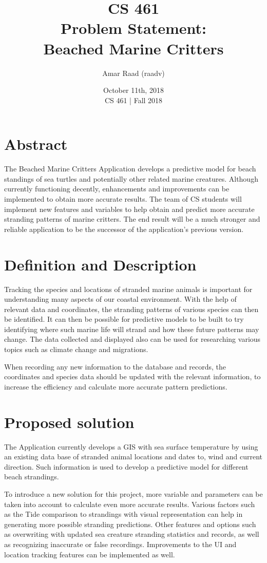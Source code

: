 \documentclass[12pt]{article}
\title{CS 461 \\ Problem Statement: \\ Beached Marine Critters \\}
\author{Amar Raad (raadv)}
\date{October 11th, 2018 \\ CS 461 | Fall 2018}
\begin{document}
\maketitle
\section{Abstract}
The Beached Marine Critters Application develops a predictive model for beach standings of sea turtles 
and potentially other related marine creatures. 
Although currently functioning decently, enhancements and improvements can be implemented to obtain more accurate results. 
The team of CS students will implement new features and variables to help obtain and predict more accurate stranding patterns of marine critters. The end result will be a much stronger and reliable application to be the successor of the application's previous version.

\newpage
\tableofcontents
\newpage
\section{Definition and Description}
Tracking the species and locations of stranded marine animals is important for understanding many aspects of our coastal environment. With the help of relevant data and coordinates, the stranding patterns of various species can then be identified. It can then be possible for predictive models to be built to try identifying where such marine life will strand and how these future patterns may change. The data collected and displayed also can be used for researching various topics such as climate change and migrations.

When recording any new information to the database and records, the coordinates and species data should be updated with the relevant information, to increase the efficiency and calculate more accurate pattern predictions.

\section{Proposed solution}
The Application currently develops a GIS with sea surface temperature by using an existing data base of stranded animal locations and dates to, wind and current direction. Such information is used to develop a predictive model for different beach strandings.

To introduce a new solution for this project, more variable and parameters can be taken into account to calculate even more accurate results. Various factors such as the Tide comparison to strandings with visual representation can help in generating more possible stranding predictions. Other features and options such as overwriting with updated sea creature stranding statistics and records, as well as recognizing inaccurate or false recordings. Improvements to the UI and location tracking features can be implemented as well.
\end{document}

